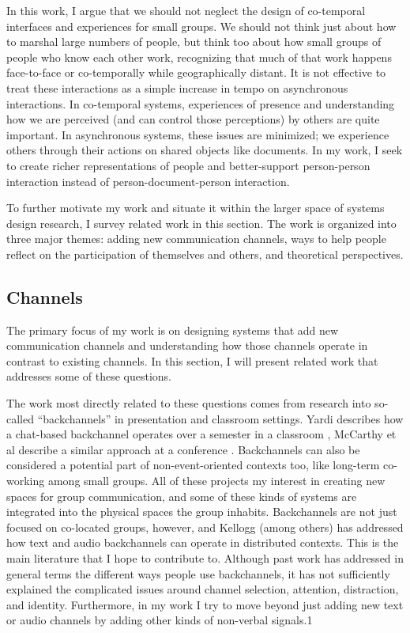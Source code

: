 \documentclass{tufte-handout}
\begin{document}
In this work, I argue that we should not neglect the design of co-temporal interfaces and experiences for small groups. We should not think just about how to marshal large numbers of people, but think too about how small groups of people who know each other work, recognizing that much of that work happens face-to-face or co-temporally while geographically distant. It is not effective to treat these interactions as a simple increase in tempo on asynchronous interactions. In co-temporal systems, experiences of presence and understanding how we are perceived (and can control those perceptions) by others are quite important. In asynchronous systems, these issues are minimized; we experience others through their actions on shared objects like documents. In my work, I seek to create richer representations of people and better-support person-person interaction instead of person-document-person interaction. 

To further motivate my work and situate it within the larger space of systems design research, I survey related work in this section. The work is organized into three major themes: adding new communication channels, ways to help people reflect on the participation of themselves and others, and theoretical perspectives.


\subsection{Channels}

The primary focus of my work is on designing systems that add new communication channels and understanding how those channels operate in contrast to existing channels. In this section, I will present related work that addresses some of these questions.

The work most directly related to these questions comes from research into so-called ``backchannels'' in presentation and classroom settings. Yardi describes how a chat-based backchannel operates over a semester in a classroom \citet{Yardi:2006uk}, McCarthy et al describe a similar approach at a conference \citet{mccarthy_digital_2004}. Backchannels can also be considered a potential part of non-event-oriented contexts too, like long-term co-working among small groups. \citet{Huang:2003ef} All of these projects my interest in creating new spaces for group communication, and some of these kinds of systems are integrated into the physical spaces the group inhabits. Backchannels are not just focused on co-located groups, however, and Kellogg (among others) \citet{kellogg_leveraging_2006} \citet{Yankelovich:2005bx} has addressed how text and audio backchannels can operate in distributed contexts. This is the main literature that I hope to contribute to. Although past work has addressed in general terms the different ways people use backchannels, it has not sufficiently explained the complicated issues around channel selection, attention, distraction, and identity. Furthermore, in my work I try to move beyond just adding new text or audio channels by adding other kinds of non-verbal signals.1
\end{document}
